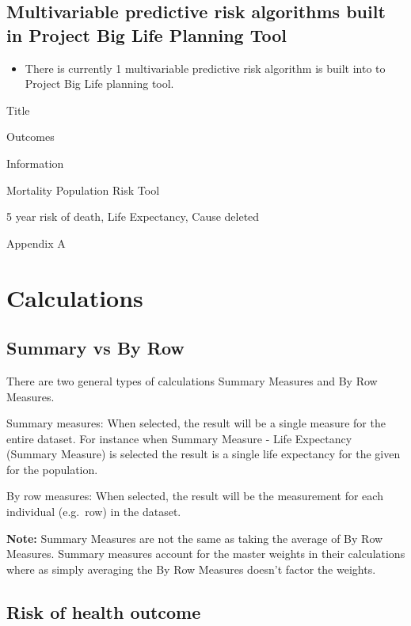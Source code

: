 \documentclass[]{book}
\providecommand{\tightlist}{%
  \setlength{\itemsep}{0pt}\setlength{\parskip}{0pt}}
\begin{document}
\subsection{Multivariable predictive risk algorithms built in Project
Big Life Planning
Tool}\label{multivariable-predictive-risk-algorithms-built-in-project-big-life-planning-tool}

\begin{itemize}
\tightlist
\item
  There is currently 1 multivariable predictive risk algorithm is built
  into to Project Big Life planning tool.
\end{itemize}

Title

Outcomes

Information

Mortality Population Risk Tool

5 year risk of death, Life Expectancy, Cause deleted

Appendix A

\section{Calculations}\label{calculations}

\subsection{Summary vs By Row}\label{summary-vs-by-row}

There are two general types of calculations Summary Measures and By Row
Measures.

Summary measures: When selected, the result will be a single measure for
the entire dataset. For instance when Summary Measure - Life Expectancy
(Summary Measure) is selected the result is a single life expectancy for
the given for the population.

By row measures: When selected, the result will be the measurement for
each individual (e.g.~row) in the dataset.

\textbf{Note:} Summary Measures are not the same as taking the average
of By Row Measures. Summary measures account for the master weights in
their calculations where as simply averaging the By Row Measures doesn't
factor the weights.

\subsection{Risk of health outcome}\label{risk-of-health-outcome}
\end{document}
